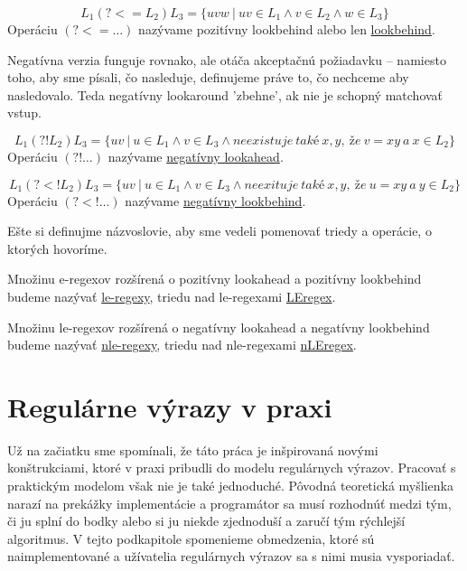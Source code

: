 \begin{df}
$$ L_{1}(?<=L_{2})L_{3} = \lbrace uvw ~|~ uv \in L_{1} \land v \in L_{2} \land w \in L_{3} \rbrace $$ Operáciu $(?<=\dots)$ nazývame pozitívny lookbehind alebo len \underline{lookbehind}.
\end{df}

Negatívna verzia funguje rovnako, ale otáča akceptačnú požiadavku -- namiesto toho, aby sme písali, čo nasleduje, definujeme práve to, čo nechceme aby nasledovalo. Teda negatívny lookaround 'zbehne', ak nie je schopný matchovať vstup.

\begin{df}
$$ L_{1}(?!L_{2})L_{3} = \lbrace uv ~|~ u \in L_{1} \land v \in L_{3} \land neexistuje~také~x,y,~že~v=xy~a~x \in L_2 \rbrace $$ Operáciu $(?!\dots)$ nazývame \underline{negatívny lookahead}.
\end{df}

\begin{df}
$$ L_{1}(?<!L_{2})L_{3} = \lbrace uv ~|~ u \in L_{1} \land v \in L_{3} \land neexituje~také~x,y,~že~u=xy~a~y \in L_2 \rbrace $$ Operáciu $(?<!\dots)$ nazývame \underline{negatívny lookbehind}.
\end{df}

Ešte si definujme názvoslovie, aby sme vedeli pomenovať triedy a operácie, o ktorých hovoríme.

\begin{df}
Množinu e-regexov rozšírená o pozitívny lookahead a pozitívny lookbehind budeme nazývať \underline{le-regexy}, triedu nad le-regexami \underline{LEregex}.
\end{df}

\begin{df}
Množinu le-regexov rozšírená o negatívny lookahead a negatívny lookbehind budeme nazývať \underline{nle-regexy}, triedu nad nle-regexami \underline{nLEregex}.
\end{df}

\section[Prax]{Regulárne výrazy v praxi}
\label{prax}

Už na začiatku sme spomínali, že táto práca je inšpirovaná novými konštrukciami, ktoré v praxi pribudli do modelu regulárnych výrazov. Pracovať s praktickým modelom však nie je také jednoduché. Pôvodná teoretická myšlienka narazí na prekážky implementácie a programátor sa musí rozhodnúť medzi tým, či ju splní do bodky alebo si ju niekde zjednoduší a zaručí tým rýchlejší algoritmus. V tejto podkapitole spomenieme obmedzenia, ktoré sú naimplementované a užívatelia regulárnych výrazov sa s nimi musia vysporiadať.

